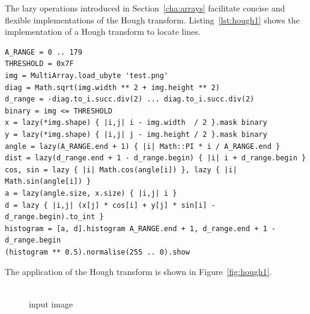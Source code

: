 \documentclass[12pt,a4paper,oneside,openright]{book}
\newcommand{\sct}[1]{Section~\ref{cha:#1}}
\newcommand{\fig}[1]{Figure~\ref{fig:#1}}
\newcommand{\lst}[1]{Listing~\ref{lst:#1}}
\newcommand{\rarr}{\ding{224}} %
\begin{document}
\begin{CJK}{UTF8}{}
The lazy operations introduced in \sct{arrays} facilitate concise and flexible implementations of the Hough transform. \lst{hough1} shows the implementation of a Hough transform to locate lines.
\lstset{language=Ruby,frame=single,numbers=left}
\begin{lstlisting}[float,caption={Hough transform to locate lines},escapechar=\$,label=lst:hough1]
A_RANGE = 0 .. 179
THRESHOLD = 0x7F
img = MultiArray.load_ubyte 'test.png'
diag = Math.sqrt(img.width ** 2 + img.height ** 2)
d_range = -diag.to_i.succ.div(2) ... diag.to_i.succ.div(2)
binary = img <= THRESHOLD
x = lazy(*img.shape) { |i,j| i - img.width  / 2 }.mask binary
y = lazy(*img.shape) { |i,j| j - img.height / 2 }.mask binary
angle = lazy(A_RANGE.end + 1) { |i| Math::PI * i / A_RANGE.end }
dist = lazy(d_range.end + 1 - d_range.begin) { |i| i + d_range.begin }
cos, sin = lazy { |i| Math.cos(angle[i]) }, lazy { |i| Math.sin(angle[i]) }
a = lazy(angle.size, x.size) { |i,j| i }
d = lazy { |i,j| (x[j] * cos[i] + y[j] * sin[i] - d_range.begin).to_int }
histogram = [a, d].histogram A_RANGE.end + 1, d_range.end + 1 - d_range.begin
(histogram ** 0.5).normalise(255 .. 0).show
\end{lstlisting}
The application of the Hough transform is shown in \fig{hough1}.
\begin{figure}[htbp]
  \begin{center}
    \begin{minipage}[c]{.29\textwidth}
      \begin{center}
        \\
        input image
      \end{center}
    \end{minipage}
    {\Huge\rarr}
    \begin{minipage}[c]{.29\textwidth}
      \begin{center}

\end{center}
\end{minipage}
\end{center}
\end{figure}
\end{CJK}
\end{document}
